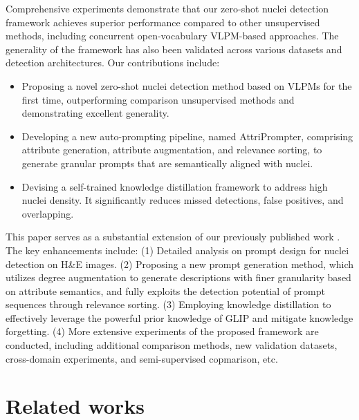 \documentclass[journal,twoside,web]{ieeecolor}
\begin{document}
Comprehensive experiments demonstrate that our zero-shot nuclei detection framework achieves superior performance compared to other unsupervised methods, including concurrent open-vocabulary VLPM-based approaches. The generality of the framework has also been validated across various datasets and detection architectures. Our contributions include: 
\begin{itemize}
    \item Proposing a novel zero-shot nuclei detection method based on VLPMs for the first time, outperforming comparison unsupervised methods and demonstrating excellent generality.
    \item Developing a new auto-prompting pipeline, named AttriPrompter, comprising attribute generation, attribute augmentation, and relevance sorting, to generate granular prompts that are semantically aligned with nuclei.
    \item Devising a self-trained knowledge distillation framework to address high nuclei density. It significantly reduces missed detections, false positives, and overlapping.
\end{itemize}

This paper serves as a substantial extension of our previously published work \cite{wu2023zeroshot}. The key enhancements include: (1) Detailed analysis on prompt design for nuclei detection on H\&E images. (2) Proposing a new prompt generation method, which utilizes degree augmentation to generate descriptions with finer granularity based on attribute semantics, and fully exploits the detection potential of prompt sequences through relevance sorting. (3) Employing knowledge distillation to effectively leverage the powerful prior knowledge of GLIP and mitigate knowledge forgetting. (4) More extensive experiments of the proposed framework are conducted, including additional comparison methods, new validation datasets, cross-domain experiments, and semi-supervised copmarison, etc.


\section{Related works}
\end{document}
